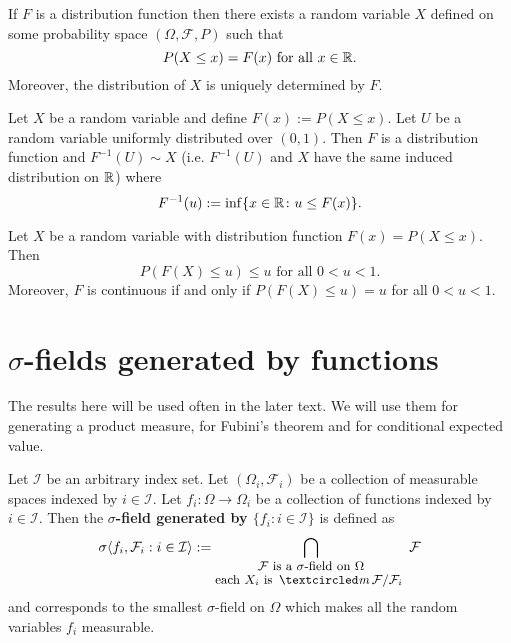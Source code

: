\begin{theorem}[{\bf Df's determine $PX^{-1}$}]
If $F$ is a distribution function then there exists a random variable $X$ defined on some probability space $(\Omega, \mathcal F, P)$ such that
\[ P(X\leq x) = F(x)\text{ for all $x\in\Bbb R$}. \]
Moreover, the distribution of $X$ is uniquely determined by $F$.
\end{theorem}


\begin{theorem}[{\bf $F^{-1}(U)\sim X$}]
Let $X$ be a random variable and define $F(x):=P(X\leq x)$. Let $U$ be a random variable uniformly distributed over $(0,1)$.  Then $F$ is a distribution function and $F^{-1}(U)\sim X$ (i.e. $F^{-1}(U)$ and $X$ have the same induced distribution on $\Bbb R$) where
\begin{equation}
\label{inverse CDF definition}
F^{-1}(u):=\inf\{x\in\Bbb R\colon u\leq F(x)  \}.
\end{equation}
\end{theorem}


\begin{theorem}[{\bf  $F(X)\sim U$}]
Let $X$ be a random variable with distribution function $F(x)=P(X\leq x)$. Then
\[ P(F(X)\leq u)\leq u\text{ for all $0<u<1$.} \]
Moreover, $F$ is continuous if and only if $P(F(X)\leq u)= u$ for all $0<u<1$.
\end{theorem}




\clearpage
%
%
\section{$\sigma$-fields generated by functions}



The results here will be used often in the later text. We will use them for generating a product measure, for Fubini's theorem and for conditional expected value.





\begin{definition}
\label{def: sig generated by funs}
Let $\mathcal I$ be an arbitrary index set.
Let $(\Omega_i, \mathcal F_i)$ be a collection of measurable spaces indexed by $i\in \mathcal I$.
Let $f_i:\Omega \rightarrow \Omega_i$ be a  collection of functions indexed by $i\in \mathcal I$. Then the {\bf $\sigma$-field generated by $\{f_i: i\in\mathcal I\}$} is defined as
\[ \sigma\langle  f_i, \mathcal F_i:i\in \mathcal I \rangle :=  \bigcap_{\shortstack{\text{\small $\mathcal F$ is a $\sigma$-field on $\Omega$}  \\
 \text{\small each $X_i$ is $\mcirc \mathcal F/\mathcal F_i$ }}}\mathcal F\]
 and corresponds to the smallest $\sigma$-field  on $\Omega$ which makes all the random variables $f_i$ measurable.
 \end{definition}


